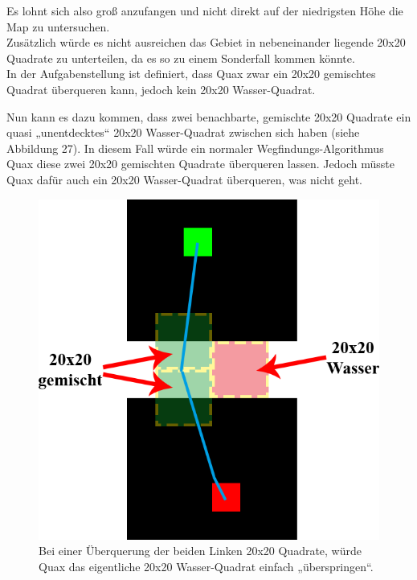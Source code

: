 \documentclass[a4paper,12pt]{article}
\begin{document}
Es lohnt sich also groß anzufangen und nicht direkt auf der niedrigsten Höhe die Map zu untersuchen.
\\[0.4cm]
Zusätzlich würde es nicht ausreichen das Gebiet in nebeneinander liegende 20x20 Quadrate zu unterteilen, da es so zu einem Sonderfall kommen könnte.
\\[0.4cm] 
In der Aufgabenstellung ist definiert, dass Quax zwar ein 20x20 gemischtes Quadrat überqueren kann, jedoch kein 20x20 Wasser-Quadrat.

Nun kann es dazu kommen, dass zwei benachbarte, gemischte 20x20 Quadrate ein quasi „unentdecktes“ 20x20 Wasser-Quadrat zwischen sich haben (siehe Abbildung 27). In diesem Fall würde ein normaler Wegfindungs-Algorithmus Quax diese zwei 20x20 gemischten Quadrate überqueren lassen. Jedoch müsste Quax dafür auch ein 20x20 Wasser-Quadrat überqueren, was nicht geht.
\begin{figure}[H]
\centering
    \includegraphics[width=0.8\linewidth]{Bilder/Aufgabe3/Sonderfall.png}
    \caption{Bei einer Überquerung der beiden Linken 20x20 Quadrate, würde Quax das eigentliche 20x20 Wasser-Quadrat einfach „überspringen“.}
\end{figure}
\end{document}
